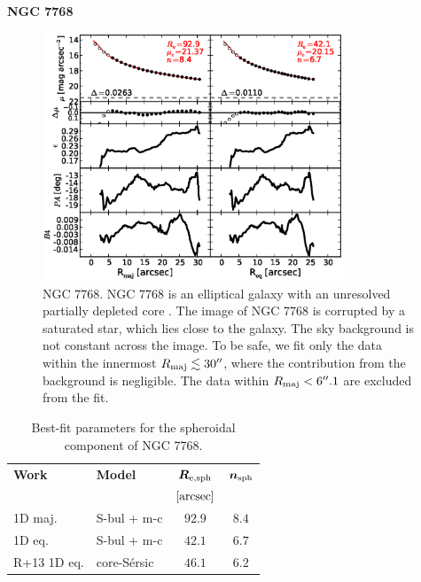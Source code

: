\documentclass[preprint2]{emulateapj}
\newcommand{\fitfigurewidth}{0.8\textwidth}
\begin{document}
  \clearpage\newpage\noindent
  {\bf NGC 7768 \\}

  \begin{figure}[h]
  \begin{center}
  \includegraphics[width=\fitfigurewidth]{images/n7768_1Dfit.eps}
  \caption{NGC 7768.
  NGC 7768 is an elliptical galaxy with an unresolved partially depleted core \citep{rusli2013}. %
  The image of NGC 7768 is corrupted by a saturated star, which lies close to the galaxy.
  The sky background is not constant across the image.
  To be safe, we fit only the data within the innermost $R_{\rm maj} \lesssim 30''$, where the contribution from the background is negligible.
  The data within $R_{\rm maj} < 6''.1$ are excluded from the fit.
  }
  \end{center}
  \end{figure}

  \begin{table}[h]
  \small
  \caption{Best-fit parameters for the spheroidal component of NGC 7768.}
  \begin{center}
  \begin{tabular}{llcc}
  \hline
  {\bf Work} & {\bf Model}   & $\bm R_{\rm e,sph}$    & $\bm n_{\rm sph}$ \\
    &  &  $[\rm arcsec]$ & \\
  \hline
  1D maj. & S-bul + m-c & $92.9$  &  $8.4$ \\
  1D eq.  & S-bul + m-c & $42.1$  &  $6.7$ \\
  \hline
  R+13 1D eq.      & core-S\'ersic & $46.1$  &  $6.2$ \\
  \hline
  \end{tabular}
  \end{center}
  \label{tab:n7768}
  \end{table}
   
\end{document}
